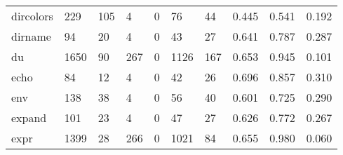 \begin{longtable}{lp{1.3cm}p{1.3cm}p{1.3cm}p{1.3cm}p{1.3cm}p{1.3cm}p{1.3cm}p{1.3cm}p{1.3cm}}
dircolors &                    229 &                                105 &                                 4 &                                0 &                                76 &                              44 &                                0.445 &                                  0.541 &                                0.192 \\
dirname   &                     94 &                                 20 &                                 4 &                                0 &                                43 &                              27 &                                0.641 &                                  0.787 &                                0.287 \\
du        &                   1650 &                                 90 &                               267 &                                0 &                              1126 &                             167 &                                0.653 &                                  0.945 &                                0.101 \\
echo      &                     84 &                                 12 &                                 4 &                                0 &                                42 &                              26 &                                0.696 &                                  0.857 &                                0.310 \\
env       &                    138 &                                 38 &                                 4 &                                0 &                                56 &                              40 &                                0.601 &                                  0.725 &                                0.290 \\
expand    &                    101 &                                 23 &                                 4 &                                0 &                                47 &                              27 &                                0.626 &                                  0.772 &                                0.267 \\
expr      &                   1399 &                                 28 &                               266 &                                0 &                              1021 &                              84 &                                0.655 &                                  0.980 &                                0.060 \\

\end{longtable}
